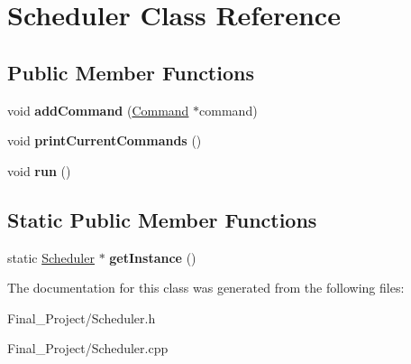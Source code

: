 \hypertarget{classScheduler}{\section{Scheduler Class Reference}
\label{classScheduler}
}
\subsection*{Public Member Functions}
\begin{DoxyCompactItemize}
\item 
\hypertarget{classScheduler_a73f2e49a61315d8138cfce5b180fd891}{void {\bfseries add\-Command} (\hyperlink{classCommand}{Command} $\ast$command)}\label{classScheduler_a73f2e49a61315d8138cfce5b180fd891}

\item 
\hypertarget{classScheduler_ae8637bc50162682e59b6b26a3b85e28d}{void {\bfseries print\-Current\-Commands} ()}\label{classScheduler_ae8637bc50162682e59b6b26a3b85e28d}

\item 
\hypertarget{classScheduler_a58fba108ce2748870a6288cd6f5fd1e3}{void {\bfseries run} ()}\label{classScheduler_a58fba108ce2748870a6288cd6f5fd1e3}

\end{DoxyCompactItemize}
\subsection*{Static Public Member Functions}
\begin{DoxyCompactItemize}
\item 
\hypertarget{classScheduler_a3fc3905ac5589d51e464100f3b8c0138}{static \hyperlink{classScheduler}{Scheduler} $\ast$ {\bfseries get\-Instance} ()}\label{classScheduler_a3fc3905ac5589d51e464100f3b8c0138}

\end{DoxyCompactItemize}


The documentation for this class was generated from the following files\-:\begin{DoxyCompactItemize}
\item 
Final\-\_\-\-Project/Scheduler.\-h\item 
Final\-\_\-\-Project/Scheduler.\-cpp\end{DoxyCompactItemize}

